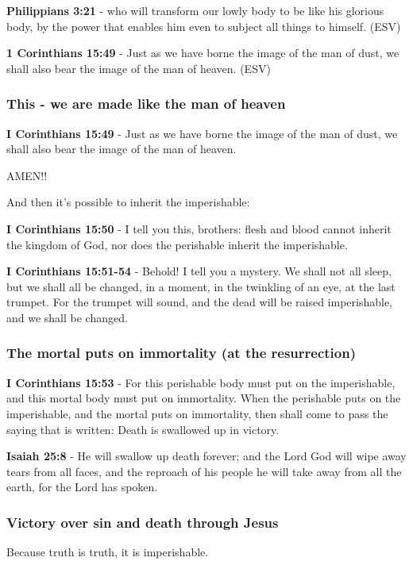 \documentclass[11pt]{article}
\begin{document}
\textbf{Philippians 3:21} -  who will transform our lowly body to be like his glorious body, by the power that enables him even to subject all things to himself.  (ESV)

\textbf{1 Corinthians 15:49} -  Just as we have borne the image of the man of dust, we shall also bear the image of the man of heaven.  (ESV)

\subsubsection{This - we are made like the man of heaven}
\label{sec:orgced0f1c}
\textbf{I Corinthians 15:49} - Just as we have borne the image of the man of dust, we shall also bear the image of the man of heaven.

AMEN!!

And then it's possible to inherit the imperishable:

\textbf{I Corinthians 15:50} - I tell you this, brothers: flesh and blood cannot inherit the kingdom of God, nor does the perishable inherit the imperishable.

\textbf{I Corinthians 15:51-54} - Behold! I tell you a mystery. We shall not all sleep, but we shall all be changed, in a moment, in the twinkling of an eye, at the last trumpet. For the trumpet will sound, and the dead will be raised imperishable, and we shall be changed.

\subsubsection{The mortal puts on immortality (at the resurrection)}
\label{sec:org91bc22f}
\textbf{I Corinthians 15:53} - For this perishable body must put on the imperishable, and this mortal body must put on immortality. When the perishable puts on the imperishable, and the mortal puts on immortality, then shall come to pass the saying that is written: Death is swallowed up in victory.

\textbf{Isaiah 25:8} - He will swallow up death forever; and the Lord God will wipe away tears from all faces, and the reproach of his people he will take away from all the earth, for the Lord has spoken.

\subsubsection{Victory over sin and death through Jesus}
\label{sec:org40e69d5}
Because truth is truth, it is imperishable.
\end{document}
